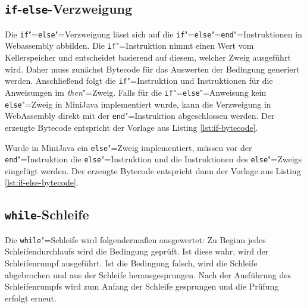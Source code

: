 

\subsection{\lstinline{if}-\lstinline{else}-Verzweigung}
Die \lstinline{if}"=\lstinline{else}"=Verzweigung lässt sich auf die \lstinline{if}"=\lstinline{else}"=\lstinline{end}"=Instruktionen in Webassembly abbilden. Die \lstinline{if}"=Instruktion nimmt einen Wert vom Kellerspeicher und entscheidet basierend auf diesem, welcher Zweig ausgeführt wird. Daher muss zunächst Bytecode für das Auswerten der Bedingung generiert werden. Anschließend folgt die \lstinline{if}"=Instruktion und Instruktionen für die Anweisungen im \emph{then}"=Zweig. Falls für die \lstinline{if}"=\lstinline{else}"=Anweisung kein \lstinline{else}"=Zweig in MiniJava implementiert wurde, kann die Verzweigung in WebAssembly direkt mit der \lstinline{end}"=Instruktion abgeschlossen werden. Der erzeugte Bytecode entspricht der Vorlage aus Listing \ref{lst:if-bytecode}.



Wurde in MiniJava ein \lstinline{else}"=Zweig implementiert, müssen vor der \lstinline{end}"=Instruktion die \lstinline{else}"=Instruktion und die Instruktionen des \lstinline{else}"=Zweigs eingefügt werden. Der erzeugte Bytecode entspricht dann der Vorlage aus Listing \ref{lst:if-else-bytecode}.



\subsection{\lstinline{while}-Schleife}

Die \lstinline{while}"=Schleife wird folgendermaßen ausgewertet: Zu Beginn jedes Schleifendurchlaufs wird die Bedingung geprüft. Ist diese wahr, wird der Schleifenrumpf ausgeführt. Ist die Bedingung falsch, wird die Schleife abgebrochen und aus der Schleife herausgesprungen. Nach der Ausführung des Schleifenrumpfs wird zum Anfang der Schleife gesprungen und die Prüfung erfolgt erneut.

